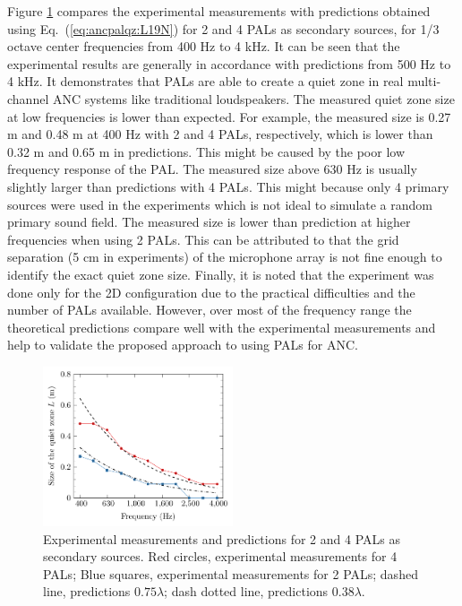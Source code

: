 Figure \ref{fig:ancpalqz_exp_result} compares the experimental measurements with predictions obtained using Eq.~(\ref{eq:ancpalqz:L19N}) for 2 and 4 PALs as secondary sources, for 1/3 octave center frequencies from 400 Hz to 4 kHz. 
It can be seen that the experimental results are generally in accordance with predictions from 500 Hz to 4 kHz. 
It demonstrates that PALs are able to create a quiet zone in real multi-channel ANC systems like traditional loudspeakers. 
The measured quiet zone size at low frequencies is lower than expected. 
For example, the measured size is 0.27 m and 0.48 m at 400 Hz with 2 and 4 PALs, respectively, which is lower than 0.32 m and 0.65 m in predictions. 
This might be caused by the poor low frequency response of the PAL. 
The measured size above 630 Hz is usually slightly larger than predictions with 4 PALs. 
This might because only 4 primary sources were used in the experiments which is not ideal to simulate a random primary sound field. 
The measured size is lower than prediction at higher frequencies when using 2 PALs. 
This can be attributed to that the grid separation (5 cm in experiments) of the microphone array is not fine enough to identify the exact quiet zone size. 
Finally, it is noted that the experiment was done only for the 2D configuration due to the practical difficulties and the number of PALs available. 
However, over most of the frequency range the theoretical predictions compare well with the experimental measurements and help to validate the proposed approach to using PALs for ANC. 

\begin{figure}[!htb]
    \centering
    \includegraphics[width = 0.5\textwidth]{fig/Exp_210821A_v2.pdf}
    \caption{Experimental measurements and predictions  for 2 and 4 PALs as secondary sources. Red circles, experimental measurements for 4 PALs; Blue squares, experimental measurements for 2 PALs; dashed line, predictions $0.75\lambda$; dash dotted line, predictions $0.38\lambda$.}
    \label{fig:ancpalqz_exp_result}
\end{figure}

